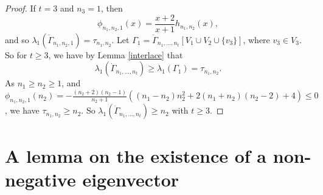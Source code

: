 \documentclass[12pt]{article}
\numberwithin{equation}{section}
\begin{document}
\begin{proof}
If $t=3$ and $n_3=1$, then 
\[
\phi_{n_1,n_2,1}(x)=\frac{x+2}{x+1}h_{n_1,n_2}(x),  
\]
and so $\lambda_1(\dot\Gamma_{n_1, n_2, 1})=\tau_{n_1,n_2}$. 
Let $\Gamma_1=\dot\Gamma_{n_1, \dots, n_t}[V_1\cup V_2\cup \{v_3\}]$, where $v_3\in V_3$. 
So for $t\ge 3$, we have by Lemma \ref{interlace} that 
\[
\lambda_1(\dot\Gamma_{n_1, \dots, n_t})\ge \lambda_1(\Gamma_1)=\tau_{n_1,n_2}.
\]
As $n_1\ge n_2\ge 1$, and 
$\phi_{n_1,n_2,1}(n_2)=-\frac{(n_2+2)(n_2-1)}{n_2+1}\left((n_1-n_2)n_2^2+2(n_1+n_2)(n_2-2)+4\right)\le 0$, we have  $\tau_{n_1,n_2}\ge n_2$.
So $\lambda_1(\dot\Gamma_{n_1, \dots, n_t})\ge n_2$ with $t\ge 3$. 
%
\end{proof}





\section{A lemma on the existence of a non-negative eigenvector}
\end{document}
